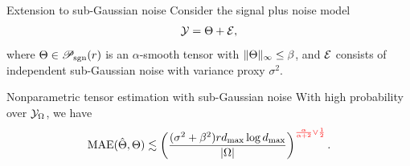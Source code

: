 \documentclass[10pt, mathserif]{beamer} %
\theoremstyle{definition}
\theoremstyle{plain}
\def\caliP{\mathscr{P}_{\textup{sgn}}}
\def\caliP{\mathscr{P}_{\textup{sgn}}}
\begin{document}



%

\begin{frame}[label=extension]{Extension to sub-Gaussian noise}
Consider the signal plus noise model
\[
\mathcal{Y}=\Theta+\mathcal{E},
\]
where $\Theta\in\caliP(r)$ is an $\alpha$-smooth tensor with $\lVert\Theta\rVert_\infty\leq \beta$, and $\mathcal{E}$ consists of independent sub-Gaussian noise with variance proxy $\sigma^2$. 

    \begin{block}{Nonparametric tensor estimation with sub-Gaussian noise}
    With high probability over $\mathcal{Y}_{\Omega}$, we have
\begin{equation}\label{eq:real}
\textup{MAE}(\hat \Theta, \Theta)\lesssim \left((\sigma^2 +\beta^2) rd_{\max} \log d_{\max}  \over |\Omega|\right)^{\color{red}{\alpha \over \alpha+2} \vee {1\over 2}}.
\end{equation}
    \end{block}


{\hfill \hyperlink{bound}{}}

\end{frame}
\end{document}
